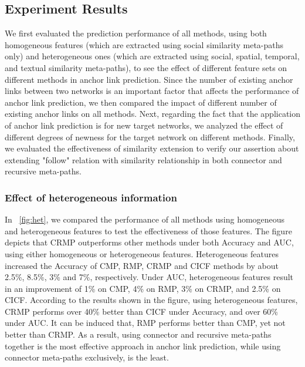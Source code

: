 \documentclass[conference]{IEEEtran}
\begin{document}
\subsection{Experiment Results}
We first evaluated the prediction performance of all methods, using both homogeneous features (which are extracted using social similarity meta-paths only) and heterogeneous ones (which are extracted using social, spatial, temporal, and textual similarity meta-paths), to see the effect of different feature sets on different methods in anchor link prediction. Since the number of existing anchor links between two networks is an important factor that affects the performance of anchor link prediction, we then compared the impact of different number of existing anchor links on all methods. Next, regarding the fact that the application of anchor link prediction is for new target networks, we analyzed the effect of different degrees of newness for the target network on different methods. Finally, we evaluated the effectiveness of similarity extension to verify our assertion about extending "follow" relation with similarity relationship in both connector and recursive meta-paths.

\subsubsection{Effect of heterogeneous information}
In \figurename~\ref{fig:het}, we compared the performance of all methods using homogeneous and heterogeneous features to test the effectiveness of those features. The figure depicts that CRMP outperforms other methods under both Accuracy and AUC, using either homogeneous or heterogeneous features. Heterogeneous features increased the Accuracy of CMP, RMP, CRMP and CICF methods by about 2.5\%, 8.5\%, 3\% and 7\%, respectively. Under AUC, heterogeneous features result in an improvement of 1\% on CMP, 4\% on RMP, 3\% on CRMP, and 2.5\% on CICF. According to the results shown in the figure, using heterogeneous features, CRMP performs over 40\% better than CICF under Accuracy, and over 60\% under AUC. It can be induced that, RMP performs better than CMP, yet not better than CRMP. As a result, using connector and recursive meta-paths together is the most effective approach in anchor link prediction, while using connector meta-paths exclusively, is the least.

\newcommand{\hetplot}[1]{
\begin{tikzpicture}
\begin{axis}
[
ybar,
tiny,
width=1.9in,
enlarge x limits=0.4,
bar width=0.07in,
legend style={at={(0.5,1.3)},
anchor=north,legend columns=-1, draw=none},
symbolic x coords={CMP, RMP, CRMP, CICF},
xtick=data,
ymin=0.4,
ymajorgrids,
y tick label style={
/pgf/number format/.cd,
fixed,
fixed zerofill,
precision=2,
/tikz/.cd
},
]
\addplot+[
fill=orange,
draw=red,
error bars/.cd,y dir=both,y explicit,error mark=.] table[x=Method,y=Value, y error=Error] {results/het-#1-sc.dat};
\addplot+[
fill=cyan,
draw=blue,
error bars/.cd,y dir=both,y explicit,error mark=.] table[x=Method,y=Value, y error=Error] {results/het-#1-sc-sp-tp-tx.dat};
\legend{Homogeneous, Heterogeneous}
\end{axis}
\end{tikzpicture}
}
\end{document}
